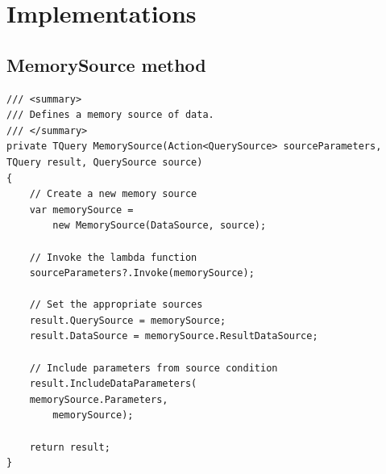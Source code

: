 \documentclass[
  print,
  table,
  nolof,
  nolot,
  nocover,
  oneside
]{fithesis3}
\begin{document}
\printbibliography[heading=bibintoc]



\appendix



\chapter{Implementations}


\section{MemorySource method}
\label{memorysource_method}

\begin{lstlisting}
/// <summary>
/// Defines a memory source of data.
/// </summary>
private TQuery MemorySource(Action<QuerySource> sourceParameters, TQuery result, QuerySource source)
{
    // Create a new memory source
    var memorySource =
        new MemorySource(DataSource, source);
    
    // Invoke the lambda function
    sourceParameters?.Invoke(memorySource);

    // Set the appropriate sources
    result.QuerySource = memorySource;
    result.DataSource = memorySource.ResultDataSource;

    // Include parameters from source condition
    result.IncludeDataParameters(
    memorySource.Parameters,
        memorySource);

    return result;
}
\end{lstlisting}
\newpage
\end{document}
